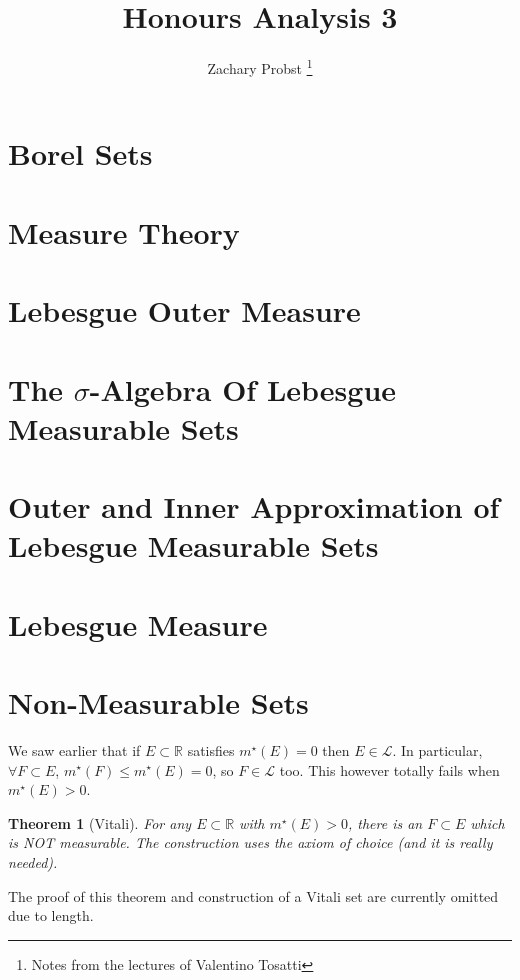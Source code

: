 \documentclass[11pt]{article}
\title{Honours Analysis 3}
\author{Zachary Probst \thanks{Notes from the lectures of Valentino Tosatti}}
\newtheorem{theorem}{Theorem}[section]
\newcommand{\mstar}[1]{m^{\star}\left(#1\right)}
\begin{document}
    \maketitle

    \section{Borel Sets}\label{sec:borel-sets}
    

    \section{Measure Theory}\label{sec:measure-theory}
    

    \section{Lebesgue Outer Measure}\label{sec:lebesgue-outer-measure}
    

    \section{The $\sigma$-Algebra Of Lebesgue Measurable Sets}\label{sec:the-$sigma$-algebra-of-lebesgue-measurable-sets}
    

    \section{Outer and Inner Approximation of Lebesgue Measurable Sets}\label{sec:outer-and-inner-approximation-of-lebesgue-measureable-sets}
    
    
    \section{Lebesgue Measure}\label{sec:lebesgue-measure}
    

    \section{Non-Measurable Sets}\label{sec:non-measurable-sets}

    We saw earlier that if $E \subset \mathbb{R}$ satisfies $\mstar{E} = 0$ then $E \in \mathcal{L}$.
    In particular, $\forall F \subset E$, $\mstar{F} \leq \mstar{E} = 0$, so $F \in \mathcal{L}$ too.
    This however totally fails when $\mstar{E} > 0$.

    \begin{theorem}[Vitali]
        For any $E \subset \mathbb{R}$ with $\mstar{E} > 0$, there is an $F \subset E$ which is NOT measurable.
        The construction uses the axiom of choice (and it is really needed).
    \end{theorem}

    The proof of this theorem and construction of a Vitali set are currently omitted due to length.
\end{document}
